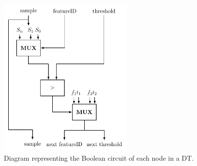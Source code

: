 \begin{figure}[!ht]
  \centering
  \includegraphics[width=0.60\textwidth]{images/decision_tree_node.pdf}
  \caption{Diagram representing the Boolean circuit of each node in a \ac{DT}.}
  \label{fig:DTNode}
\end{figure}




                    




